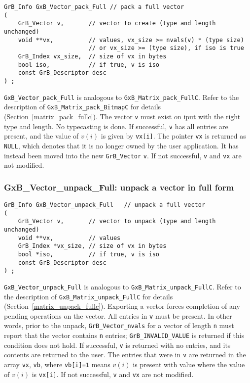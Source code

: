 \documentclass[12pt]{article}
\begin{document}
\begin{mdframed}[userdefinedwidth=6in]
{\footnotesize
\begin{verbatim}
GrB_Info GxB_Vector_pack_Full // pack a full vector
(
    GrB_Vector v,       // vector to create (type and length unchanged)
    void **vx,          // values, vx_size >= nvals(v) * (type size)
                        // or vx_size >= (type size), if iso is true
    GrB_Index vx_size,  // size of vx in bytes
    bool iso,           // if true, v is iso
    const GrB_Descriptor desc
) ;
\end{verbatim}
} \end{mdframed}

\noindent
\verb'GxB_Vector_pack_Full' is analogous to \verb'GxB_Matrix_pack_FullC'.
Refer to the description of \verb'GxB_Matrix_pack_BitmapC' for details
(Section~\ref{matrix_pack_fullc}).
The vector \verb'v' must exist on iput with the right type and length.
No typecasting is done.
If successful, \verb'v' has
all entries are present, and the value of $v(i)$ is given by \verb'vx[i]'.
The pointer \verb'vx' is returned as \verb'NULL', which denotes that it is no
longer owned by the user application.  It has instead been moved into the new
\verb'GrB_Vector' \verb'v'.
If not successful, \verb'v' and
\verb'vx' are not modified.

\subsubsection{{\sf GxB\_Vector\_unpack\_Full:} unpack a vector in full form}
\label{vector_unpack_full}

\begin{mdframed}[userdefinedwidth=6in]
{\footnotesize
\begin{verbatim}
GrB_Info GxB_Vector_unpack_Full   // unpack a full vector
(
    GrB_Vector v,       // vector to unpack (type and length unchanged)
    void **vx,          // values
    GrB_Index *vx_size, // size of vx in bytes
    bool *iso,          // if true, v is iso
    const GrB_Descriptor desc
) ;
\end{verbatim}
} \end{mdframed}

\verb'GxB_Vector_unpack_Full' is analogous to \verb'GxB_Matrix_unpack_FullC'.
Refer to the description of \verb'GxB_Matrix_unpack_FullC' for details
(Section~\ref{matrix_unpack_fullc}).
Exporting a vector forces completion of any pending operations on the vector.
All entries in \verb'v' must be present.  In other words, prior to the unpack,
\verb'GrB_Vector_nvals' for a vector of length \verb'n' must report that the
vector contains \verb'n' entries; \verb'GrB_INVALID_VALUE' is returned if this
condition does not hold.
If successful, \verb'v' is returned with no entries, and its contents are
returned to the user. The entries
that were in \verb'v' are returned in the array \verb'vx', \verb'vb', where
\verb'vb[i]=1' means $v(i)$ is present with value where the value of $v(i)$ is
\verb'vx[i]'.
If not successful, \verb'v' and \verb'vx' are not modified.
\end{document}

